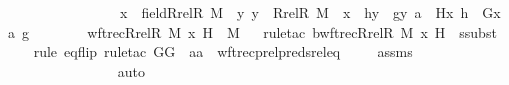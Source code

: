 \begin{isabellebody}
\ \ \ \ \ \ \ \ \ \ \ \ \ \ \ {\isasymLongrightarrow}\ x\ {\isasymin}\ field{\isacharparenleft}{\kern0pt}Rrel{\isacharparenleft}{\kern0pt}R{\isacharcomma}{\kern0pt}\ M{\isacharparenright}{\kern0pt}{\isacharparenright}{\kern0pt}\ {\isasymLongrightarrow}\ {\isacharparenleft}{\kern0pt}{\isasymAnd}y{\isachardot}{\kern0pt}\ y\ {\isasymin}\ Rrel{\isacharparenleft}{\kern0pt}R{\isacharcomma}{\kern0pt}\ M{\isacharparenright}{\kern0pt}\ {\isacharminus}{\kern0pt}{\isacharbackquote}{\kern0pt}{\isacharbackquote}{\kern0pt}\ {\isacharbraceleft}{\kern0pt}x{\isacharbraceright}{\kern0pt}\ {\isasymLongrightarrow}\ h{\isacharbackquote}{\kern0pt}y\ {\isacharequal}{\kern0pt}\ g{\isacharbackquote}{\kern0pt}{\isacharless}{\kern0pt}y{\isacharcomma}{\kern0pt}\ a{\isachargreater}{\kern0pt}{\isacharparenright}{\kern0pt}\ {\isasymLongrightarrow}\ H{\isacharparenleft}{\kern0pt}x{\isacharcomma}{\kern0pt}\ h{\isacharparenright}{\kern0pt}\ {\isacharequal}{\kern0pt}\ G{\isacharparenleft}{\kern0pt}{\isacharless}{\kern0pt}x{\isacharcomma}{\kern0pt}\ a{\isachargreater}{\kern0pt}{\isacharcomma}{\kern0pt}\ g{\isacharparenright}{\kern0pt}{\isachardoublequoteclose}\ \ \isanewline
\ \ \isanewline
\ \ \ {\isachardoublequoteopen}wftrec{\isacharparenleft}{\kern0pt}Rrel{\isacharparenleft}{\kern0pt}R{\isacharcomma}{\kern0pt}\ M{\isacharparenright}{\kern0pt}{\isacharcomma}{\kern0pt}\ x{\isacharcomma}{\kern0pt}\ H{\isacharparenright}{\kern0pt}\ {\isasymin}\ M{\isachardoublequoteclose}\isanewline
%
\isadelimproof
\isanewline
\ \ %
\endisadelimproof
%
\isatagproof
{}\isamarkupfalse%
{\isacharparenleft}{\kern0pt}rule{\isacharunderscore}{\kern0pt}tac\ b{\isacharequal}{\kern0pt}{\isachardoublequoteopen}wftrec{\isacharparenleft}{\kern0pt}Rrel{\isacharparenleft}{\kern0pt}R{\isacharcomma}{\kern0pt}\ M{\isacharparenright}{\kern0pt}{\isacharcomma}{\kern0pt}\ x{\isacharcomma}{\kern0pt}\ H{\isacharparenright}{\kern0pt}{\isachardoublequoteclose}\ \ ssubst{\isacharparenright}{\kern0pt}\ \isanewline
\ \ \ \isamarkupfalse%
{\isacharparenleft}{\kern0pt}rule\ eq{\isacharunderscore}{\kern0pt}flip{\isacharcomma}{\kern0pt}\ rule{\isacharunderscore}{\kern0pt}tac\ G{\isacharequal}{\kern0pt}G\ \ a{\isacharequal}{\kern0pt}a\ \ wftrec{\isacharunderscore}{\kern0pt}prel{\isacharunderscore}{\kern0pt}preds{\isacharunderscore}{\kern0pt}rel{\isacharunderscore}{\kern0pt}eq{\isacharparenright}{\kern0pt}\ \isanewline
\ \ \isamarkupfalse%
\ assms\ \isanewline
\ \ \ \ \ \ \ \ \ \ \ \ \ \ \isamarkupfalse%
\ auto{\isacharbrackleft}{\kern0pt}{}{}{\isacharbrackright}{\kern0pt}\isanewline

\end{isabellebody}
